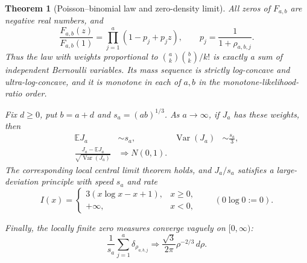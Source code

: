 \documentclass[11pt]{article}
\theoremstyle{keio}
\newtheorem{theorem}{Theorem}[section]
\theoremstyle{definition}
\theoremstyle{remark}
\newcommand{\Var}{\operatorname{Var}}
\begin{document}
\begin{theorem}[Poisson--binomial law and zero-density limit]
\label{thm:poisson-binomial}
All zeros of \(F_{a,b}\) are negative real numbers, and
\begin{equation}\label{eq:Poisson-binomial-factor}
 \frac{F_{a,b}(z)}{F_{a,b}(1)}
 =\prod_{j=1}^a(1-p_j+p_jz),
 \qquad p_j=\frac1{1+\rho_{a,b,j}}.
\end{equation}
Thus the law with weights proportional to
\(\binom ak\binom bk/k!\) is exactly a sum of independent Bernoulli
variables.  Its mass sequence is strictly log-concave and ultra-log-concave,
and it is monotone in each of \(a,b\) in the monotone-likelihood-ratio order.

Fix \(d\ge0\), put \(b=a+d\) and \(s_a=(ab)^{1/3}\).  As \(a\to\infty\),
if \(J_a\) has these weights, then
\begin{align}
 \mathbb EJ_a&\sim s_a,&
 \Var(J_a)&\sim\frac{s_a}{3},
 \label{eq:Ja-mean-var}\\
 \frac{J_a-\mathbb EJ_a}{\sqrt{\Var(J_a)}}&\Longrightarrow N(0,1).
 \label{eq:Ja-CLT}
\end{align}
The corresponding local central limit theorem holds, and \(J_a/s_a\)
satisfies a large-deviation principle with speed \(s_a\) and rate
\begin{equation}\label{eq:Ja-rate}
 I(x)=
 \begin{cases}
 3(x\log x-x+1),&x\ge0,\\
 +\infty,&x<0,
 \end{cases}
 \qquad(0\log0:=0).
\end{equation}

Finally, the locally finite zero measures converge vaguely on
\([0,\infty)\):
\begin{equation}\label{eq:zero-density-limit}
 \boxed{\displaystyle
 \frac1{s_a}\sum_{j=1}^a\delta_{\rho_{a,b,j}}
 \Longrightarrow
 \frac{\sqrt3}{2\pi}\rho^{-2/3}\,d\rho.}
\end{equation}
\end{theorem}
\end{document}
